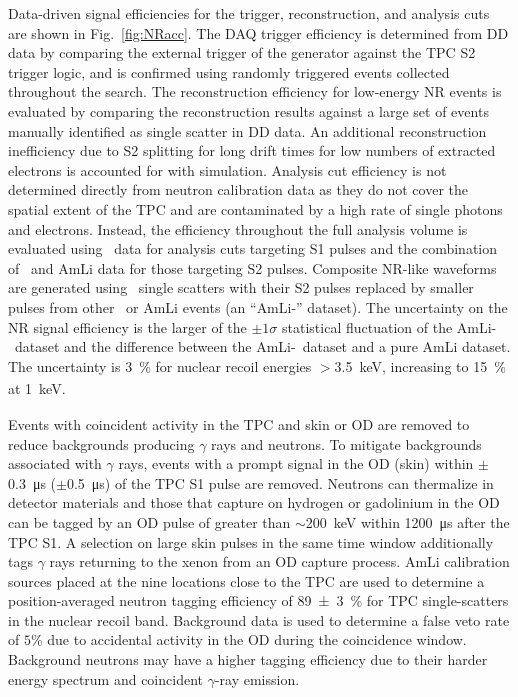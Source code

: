 Data-driven signal efficiencies for the trigger, reconstruction, and analysis cuts are shown in Fig.~\ref{fig:NRacc}. The DAQ trigger efficiency is determined from DD data by comparing the external trigger of the generator against the TPC S2 trigger logic, and is confirmed using randomly triggered events collected throughout the search.
The reconstruction efficiency for low-energy NR events is evaluated by comparing the reconstruction results against a large set of events manually identified as single scatter in DD data. An additional reconstruction inefficiency due to S2 splitting for long drift times for low numbers of extracted electrons is accounted for with simulation.
Analysis cut efficiency is not determined directly from neutron calibration data as they do not cover the spatial extent of the TPC and are contaminated by a high rate of single photons and electrons. 
Instead, the efficiency throughout the full analysis volume is evaluated using \tritium\ data for analysis cuts targeting S1 pulses and the combination of \tritium\ and AmLi data for those targeting S2 pulses. Composite NR-like waveforms are generated using \tritium\ single scatters with their S2 pulses replaced by smaller pulses from other \tritium\ or AmLi events (an ``AmLi-\tritium'' dataset).  The uncertainty on the NR signal efficiency is the larger of the $\pm1\sigma$ statistical fluctuation of the AmLi-\tritium\ dataset and the difference between the AmLi-\tritium\ dataset and a pure AmLi dataset. The uncertainty is \SI{3}{\percent} for nuclear recoil energies $>$\SI{3.5}{keV_{}}, increasing to \SI{15}{\percent} at \SI{1}{keV_{}}.

Events with coincident activity in the TPC and skin or OD are removed to reduce backgrounds producing $\gamma$ rays and neutrons. To mitigate backgrounds associated with $\gamma$ rays, events with a prompt signal in the OD (skin) within $\pm$\SI{0.3}{\micro\s} ($\pm$\SI{0.5}{\micro\s}) of the TPC S1 pulse are removed. Neutrons can thermalize in detector materials and those that capture on  hydrogen or gadolinium in the OD can be tagged by an OD pulse of greater than $\sim$\SI{200}{keV} within \SI{1200}{\micro\s} after the TPC S1. A selection on large skin pulses in the same time window additionally tags $\gamma$ rays returning to the xenon from an OD capture process. AmLi calibration sources placed at the nine locations close to the TPC are used to determine a position-averaged neutron tagging efficiency of \SI{89(3)}{\percent} for TPC single-scatters in the nuclear recoil band. Background data is used to determine a false veto rate of $5\%$ due to accidental activity in the OD during the coincidence window. Background neutrons may have a higher tagging efficiency due to their harder energy spectrum and coincident $\gamma$-ray emission.

